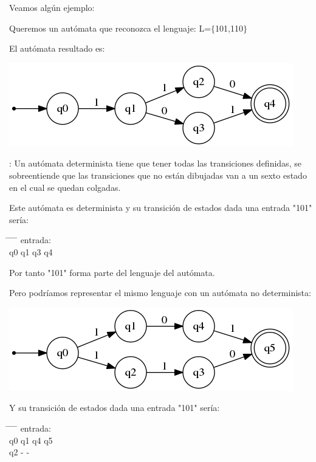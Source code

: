 \documentclass{apuntes}
\begin{document}
Veamos algún ejemplo:
\begin{example}
Queremos un autómata que reconozca el lenguaje: L=$\lbrace$101,110$\rbrace$

El autómata resultado es:
\begin{center}
\includegraphics[scale=0.75]{automata2.png}
\end{center}
\obs: Un autómata determinista tiene que tener todas las transiciones definidas, se sobreentiende que las transiciones que no están dibujadas van a un sexto estado en el cual se quedan colgadas.

Este autómata es determinista y su transición de estados dada una entrada "101" sería:

 \begin{tabbing}
   \hspace*{2cm} \= \hspace*{2cm} \= \hspace*{2cm} \= \hspace*{2cm} \= \kill
  entrada:         \\
 q0 \> q1 \> q3 \> q4  \\
 \end{tabbing}

Por tanto "101" forma parte del lenguaje del autómata.

Pero podríamos representar el mismo lenguaje con un autómata no determinista:
\begin{center}
\includegraphics[scale=0.75]{automata3.png}
\end{center}
Y su transición de estados dada una entrada "101" sería:

 \begin{tabbing}
   \hspace*{2cm} \= \hspace*{2cm} \= \hspace*{2cm} \= \hspace*{2cm} \= \kill
  entrada:         \\
 q0 \> q1 \> q4 \> q5\\
  \> q2 \> - \> - \\


\end{tabbing}
\end{example}
\end{document}
